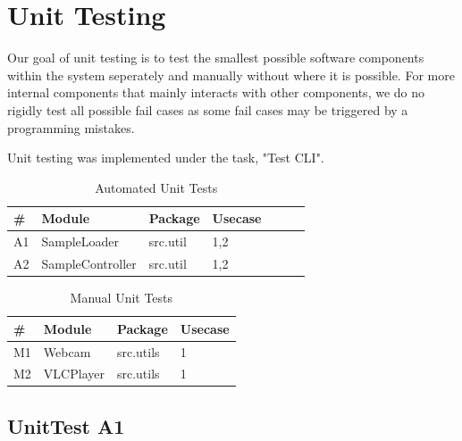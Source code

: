 \documentclass[12pt,a4paper,man]{report}
\begin{document}
\section{Unit Testing}
\label{sec:org77f3fe5}
Our goal of unit testing is to test the smallest possible software components within the system seperately and manually without where it is possible. For more internal components that mainly interacts with other components, we do no rigidly test all possible fail cases as some fail cases may be triggered by a programming mistakes. 

Unit testing was implemented under the task, "Test CLI". 

\begin{table}[htbp]
\caption{\label{table:autests}
Automated Unit Tests}
\centering
\begin{tabular}{|l|l|l|l|l|lp{3cm}|}
\hline
\textbf{\#} & \textbf{Module} & \textbf{Package} & \textbf{Usecase}\\
\hline
A1 & SampleLoader & src.util & 1,2\\
A2 & SampleController & src.util & 1,2\\
\hline
\end{tabular}
\end{table}

\begin{table}[htbp]
\caption{\label{table:mutests}
Manual Unit Tests}
\centering
\begin{tabular}{|l|l|lp{3cm}|}
\hline
\textbf{\#} & \textbf{Module} & \textbf{Package} & \textbf{Usecase}\\
\hline
M1 & Webcam & src.utils & 1\\
M2 & VLCPlayer & src.utils & 1\\
\hline
\end{tabular}
\end{table}

\subsection{UnitTest A1}
\label{sec:org904b369}
\end{document}
